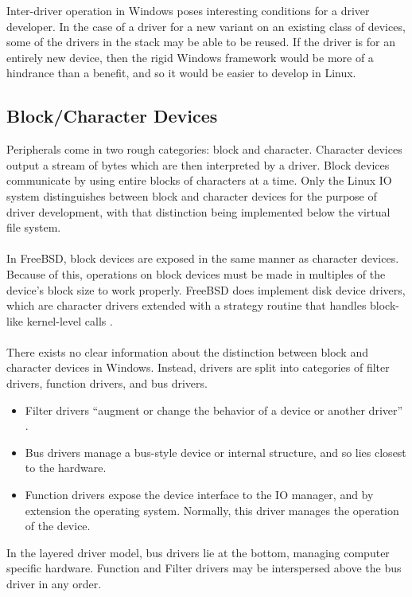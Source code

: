 \documentclass[10pt,draftclsnofoot,onecolumn]{article}
\begin{document}
\noindent Inter-driver operation in Windows poses interesting conditions for a driver developer. In the case of a driver for a new variant on an existing class of devices, some of the drivers in the stack may be able to be reused. If the driver is for an entirely new device, then the rigid Windows framework would be more of a hindrance than a benefit, and so it would be easier to develop in Linux.

\subsection{Block/Character Devices}

Peripherals come in two rough categories: block and character. Character devices output a stream of bytes which are then interpreted by a driver. Block devices communicate by using entire blocks of characters at a time. Only the Linux IO system distinguishes between block and character devices for the purpose of driver development, with that distinction being implemented below the virtual file system.
\\\\
In FreeBSD, block devices are exposed in the same manner as character devices. Because of this, operations on block devices must be made in multiples of the device’s block size to work properly. FreeBSD does implement disk device drivers, which are character drivers extended with a strategy routine that handles block-like kernel-level calls \cite{BSDM}.
\\\\
There exists no clear information about the distinction between block and character devices in Windows. Instead, drivers are split into categories of filter drivers, function drivers, and bus drivers. \\

\begin{itemize}
	\item Filter drivers “augment or change the behavior of a device or another driver” \cite{Wandos}. 
	\item Bus drivers manage a bus-style device or internal structure, and so lies closest to the hardware.
	\item Function drivers expose the device interface to the IO manager, and by extension the operating system. Normally, this driver manages the operation of the device.
\end{itemize}

\noindent In the layered driver model, bus drivers lie at the bottom, managing computer specific hardware. Function and Filter drivers may be interspersed above the bus driver in any order. 
\end{document}
